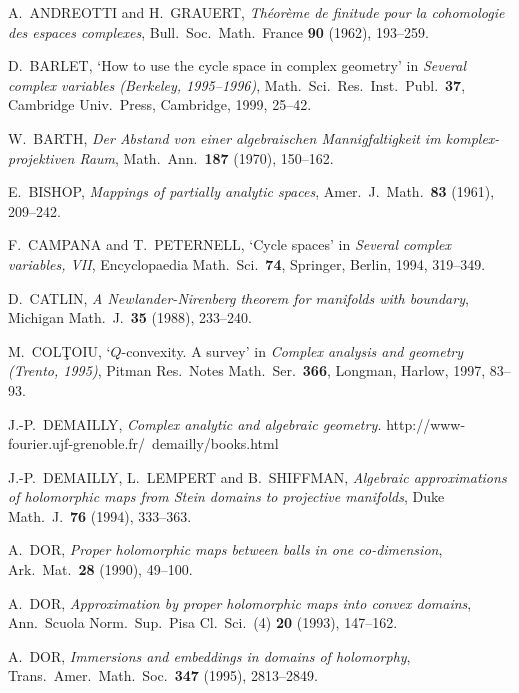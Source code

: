\documentclass[11pt]{amsart}
\numberwithin{equation}{section}
\theoremstyle{definition}
\begin{document}

\begin{thebibliography}{10}

A.\ ANDREOTTI and H.\ GRAUERT,  
\textit{Th\'eor\`eme de finitude pour la cohomologie des espaces complexes},   
Bull.\ Soc.\ Math.\ France \textbf{90} (1962), 193--259.

D.\ BARLET, `How to use the cycle space in complex geometry' in
\textit{Several complex variables (Berkeley, 1995--1996)},
Math.\ Sci.\ Res.\ Inst.\ Publ.\ \textbf{37}, 
Cambridge Univ.\ Press, Cambridge, 1999, 25--42. 

W.\ BARTH,  
\textit{Der Abstand von einer algebraischen Mannigfaltigkeit im 
komplex-projektiven Raum},
Math.\ Ann.\ \textbf{187} (1970), 150--162.

E.\ BISHOP, 
\textit{Mappings of partially analytic spaces}, 
Amer.\ J.\ Math.\ \textbf{83} (1961), 209--242.

F.\ CAMPANA and T.\ PETERNELL, 
`Cycle spaces' in \textit{Several complex variables, VII}, 
Encyclopaedia Math.\ Sci.\  \textbf{74}, 
Springer, Berlin, 1994, 319--349.

D.\ CATLIN, 
\textit{A Newlander-Nirenberg theorem for manifolds with boundary}, 
Michigan Math.\ J.\	\textbf{35} (1988), 233--240.

M.\ COL\c TOIU, `$Q$-convexity. A survey' in 
\textit{Complex analysis and geometry (Trento, 1995)},  
Pitman Res.\ Notes Math.\ Ser.\ \textbf{366}, 
Longman, Harlow, 1997, 83--93. 

J.-P.\ DEMAILLY,
\textit{Complex analytic and algebraic geometry.}
http://www-fourier.ujf-grenoble.fr/~demailly/books.html

J.-P.\ DEMAILLY, L.\ LEMPERT and B.\ SHIFFMAN, 
\textit{Algebraic approximations of holomorphic maps from
Stein domains to projective manifolds},
Duke Math.\ J.\ \textbf{76} (1994), 333--363.

A.\ DOR, 
\textit{Proper holomorphic maps between balls in one co-dimension}, 
Ark.\ Mat.\ \textbf{28} (1990),  49--100. 

A.\ DOR, 
\textit{Approximation by proper holomorphic maps into convex domains}, 
Ann.\ Scuola Norm.\ Sup.\ Pisa Cl.\ Sci.\ (4) \textbf{20} (1993), 147--162.

A.\ DOR, 
\textit{Immersions and embeddings in domains of holomorphy},
Trans.\ Amer.\ Math.\ Soc.\ \textbf{347} (1995), 2813--2849.


\end{thebibliography}
\end{document}
